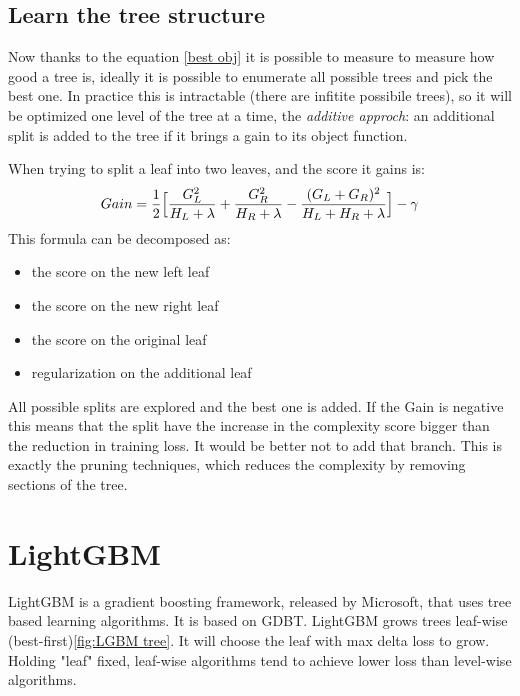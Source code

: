 \documentclass[a4paper, oneside]{book}
\begin{document}
			\subsection{Learn the tree structure}
			Now thanks to the equation \eqref{best obj} it is possible to measure to measure how good a tree is, ideally it is possible to enumerate all possible trees and pick the best one. In practice this is intractable (there are infitite possibile trees), so it will be optimized one level of the tree at a time, the \textit{additive approch}: an additional split is added to the tree if it brings a gain to its object function.
			
			When trying to split a leaf into two leaves, and the score it gains is:
			\begin{equation}
				Gain = \frac{1}{2}\Bigl[\dfrac{G_L^2}{H_L+\lambda} + \dfrac{G_R^2}{H_R+\lambda} - \dfrac{(G_L+G_R)^2}{H_L+H_R+\lambda}\Bigr] - \gamma
			\end{equation}
			This formula can be decomposed as:
			\begin{itemize}
				\item the score on the new left leaf
				\item the score on the new right leaf
				\item the score on the original leaf
				\item regularization on the additional leaf
			\end{itemize} 
			All possible splits are explored and the best one is added. If the Gain is negative this means that the split have the increase in the complexity score bigger than the reduction in training loss. It would be better not to add that branch. This is exactly the pruning techniques, which reduces the complexity by removing sections of the tree.
			
		\section{LightGBM}
		\cite{LGBM}LightGBM is a gradient boosting framework, released  by Microsoft, that uses tree based learning algorithms. It is based on GDBT.
		LightGBM grows trees leaf-wise (best-first)\ref{fig:LGBM tree}. It will choose the leaf with max delta loss to grow. Holding "leaf" fixed, leaf-wise algorithms tend to achieve lower loss than level-wise algorithms.
		
\end{document}
